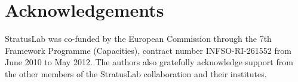 \section*{Acknowledgements}

StratusLab was co-funded by the European Commission through the 7th
Framework Programme (Capacities), contract number INFSO-RI-261552 from
June 2010 to May 2012\@.  The authors also gratefully acknowledge
support from the other members of the StratusLab collaboration and
their institutes.

